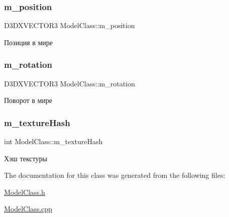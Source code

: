 \mbox{\label{class_model_class_a38909735986bc1efe5a64bf921b759f7}} 
\subsubsection{\texorpdfstring{m\+\_\+position}{m\_position}}
{\footnotesize\ttfamily D3\+D\+X\+V\+E\+C\+T\+O\+R3 Model\+Class\+::m\+\_\+position\hspace{0.3cm}{\ttfamily [private]}}



Позиция в мире 

\mbox{\label{class_model_class_adbeac264bd99cedbe00f3ca03f546209}} 
\subsubsection{\texorpdfstring{m\+\_\+rotation}{m\_rotation}}
{\footnotesize\ttfamily D3\+D\+X\+V\+E\+C\+T\+O\+R3 Model\+Class\+::m\+\_\+rotation\hspace{0.3cm}{\ttfamily [private]}}



Поворот в мире 

\mbox{\label{class_model_class_a7ac5fd4bd5dde084256bcccf1d0a2827}} 
\subsubsection{\texorpdfstring{m\+\_\+texture\+Hash}{m\_textureHash}}
{\footnotesize\ttfamily int Model\+Class\+::m\+\_\+texture\+Hash\hspace{0.3cm}{\ttfamily [private]}}



Хэш текстуры 



The documentation for this class was generated from the following files\+:\begin{DoxyCompactItemize}
\item 
\hyperlink{_model_class_8h}{Model\+Class.\+h}\item 
\hyperlink{_model_class_8cpp}{Model\+Class.\+cpp}\end{DoxyCompactItemize}

